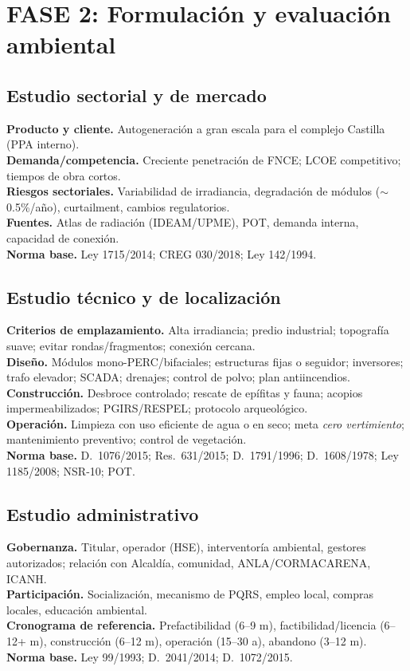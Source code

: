 \section{FASE 2: Formulación y evaluación ambiental}
\subsection{Estudio sectorial y de mercado}
\textbf{Producto y cliente.} Autogeneración a gran escala para el complejo Castilla (PPA interno).\\
\textbf{Demanda/competencia.} Creciente penetración de FNCE; LCOE competitivo; tiempos de obra cortos.\\
\textbf{Riesgos sectoriales.} Variabilidad de irradiancia, degradación de módulos ($\sim$0.5\%/año), curtailment, cambios regulatorios.\\
\textbf{Fuentes.} Atlas de radiación (IDEAM/UPME), POT, demanda interna, capacidad de conexión.\\
\textbf{Norma base.} Ley 1715/2014; CREG 030/2018; Ley 142/1994.

\subsection{Estudio técnico y de localización}
\textbf{Criterios de emplazamiento.} Alta irradiancia; predio industrial; topografía suave; evitar rondas/fragmentos; conexión cercana.\\
\textbf{Diseño.} Módulos mono-PERC/bifaciales; estructuras fijas o seguidor; inversores; trafo elevador; SCADA; drenajes; control de polvo; plan antiincendios.\\
\textbf{Construcción.} Desbroce controlado; rescate de epífitas y fauna; acopios impermeabilizados; PGIRS/RESPEL; protocolo arqueológico.\\
\textbf{Operación.} Limpieza con uso eficiente de agua o en seco; meta \textit{cero vertimiento}; mantenimiento preventivo; control de vegetación.\\
\textbf{Norma base.} D.\ 1076/2015; Res.\ 631/2015; D.\ 1791/1996; D.\ 1608/1978; Ley 1185/2008; NSR-10; POT.

\subsection{Estudio administrativo}
\textbf{Gobernanza.} Titular, operador (HSE), interventoría ambiental, gestores autorizados; relación con Alcaldía, comunidad, ANLA/CORMACARENA, ICANH.\\
\textbf{Participación.} Socialización, mecanismo de PQRS, empleo local, compras locales, educación ambiental.\\
\textbf{Cronograma de referencia.} Prefactibilidad (6--9 m), factibilidad/licencia (6--12+ m), construcción (6--12 m), operación (15--30 a), abandono (3--12 m).\\
\textbf{Norma base.} Ley 99/1993; D.\ 2041/2014; D.\ 1072/2015.

